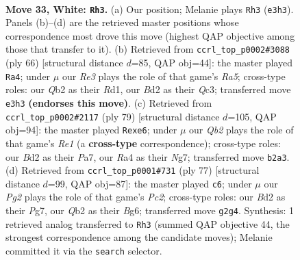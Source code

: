 \documentclass[11pt]{article}
\begin{document}
\clearpage

\begin{figure}[p]\centering
\begin{subfigure}{0.46\textwidth}\centering
\resizebox{\linewidth}{!}{%
\newchessgame
\chessboard[
  setfen={1r6/n3rk2/p2p2pb/3P3p/Rpq1p2P/4R3/1Q1BNPP1/5K2 w - - 1 33},
  showmover=false,
  pgfstyle=straightmove, color=movearrow, markmove={e3-h3}
]}
\caption{}
\end{subfigure}\hfill
\begin{subfigure}{0.46\textwidth}\centering
\resizebox{\linewidth}{!}{%
\newchessgame
\chessboard[
  setfen={5rk1/r4pp1/pq1Pp3/R3P1P1/2pNb3/2Q5/5P2/3R2K1 w - - 4 34},
  showmover=false,
  pgfstyle=straightmove, color=movearrow, markmove={a5-a4}
]}
\caption{}
\end{subfigure}
\\[4pt]
\begin{subfigure}{0.46\textwidth}\centering
\resizebox{\linewidth}{!}{%
\newchessgame
\chessboard[
  setfen={4r1k1/p5np/3rP1p1/1ppP1p2/5B2/Pq6/6QP/3R1R1K b - - 9 40},
  showmover=false,
  pgfstyle=straightmove, color=movearrow, markmove={e8-e6}
]}
\caption{}
\end{subfigure}\hfill
\begin{subfigure}{0.46\textwidth}\centering
\resizebox{\linewidth}{!}{%
\newchessgame
\chessboard[
  setfen={6k1/2p2pp1/4p1b1/2NrP1P1/1r1P1R1p/qP5P/P2Q4/K5R1 b - - 8 39},
  showmover=false,
  pgfstyle=straightmove, color=movearrow, markmove={c7-c6}
]}
\caption{}
\end{subfigure}
\caption{\textbf{Move 33, White: \texttt{Rh3}.} (a) Our position; Melanie plays \texttt{Rh3} (\texttt{e3h3}). Panels (b)--(d) are the retrieved master positions whose correspondence most drove this move (highest QAP objective among those that transfer to it). (b) Retrieved from \texttt{ccrl\_top\_p0002\#3088} (ply 66) [structural distance $d$=85, QAP obj=44]: the master played \texttt{Ra4}; under $\mu$ our \emph{Re3} plays the role of that game's \emph{Ra5}; cross-type roles: our \emph{Q}b2 as their \emph{R}d1, our \emph{B}d2 as their \emph{Q}c3; transferred move \texttt{e3h3} \textbf{(endorses this move)}. (c) Retrieved from \texttt{ccrl\_top\_p0002\#2117} (ply 79) [structural distance $d$=105, QAP obj=94]: the master played \texttt{Rexe6}; under $\mu$ our \emph{Qb2} plays the role of that game's \emph{Re1} (a \textbf{cross-type} correspondence); cross-type roles: our \emph{B}d2 as their \emph{P}a7, our \emph{R}a4 as their \emph{N}g7; transferred move \texttt{b2a3}. (d) Retrieved from \texttt{ccrl\_top\_p0001\#731} (ply 77) [structural distance $d$=99, QAP obj=87]: the master played \texttt{c6}; under $\mu$ our \emph{Pg2} plays the role of that game's \emph{Pc2}; cross-type roles: our \emph{B}d2 as their \emph{P}g7, our \emph{Q}b2 as their \emph{B}g6; transferred move \texttt{g2g4}. Synthesis: 1 retrieved analog transferred to \texttt{Rh3} (summed QAP objective 44, the strongest correspondence among the candidate moves); Melanie committed it via the \texttt{search} selector.}
\label{fig:thought-m64}
\end{figure}
\end{document}
